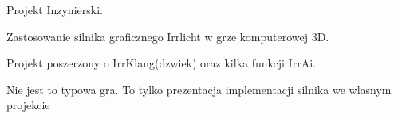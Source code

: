 
\begin{DoxyEnumerate}
\item Projekt Inzynierski.
\item Zastosowanie silnika graficznego Irrlicht w grze komputerowej 3D.
\end{DoxyEnumerate}

\par
 Projekt poszerzony o IrrKlang(dzwiek) oraz kilka funkcji IrrAi. \par
 \par
 Nie jest to typowa gra. To tylko prezentacja implementacji silnika we wlasnym projekcie \par
 